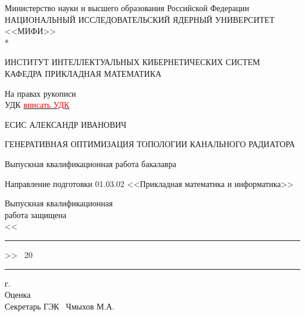 \documentclass[a4paper,12pt]{extreport}
\numberwithin{equation}{chapter}
\begin{document}
\renewcommand{\contentsname}{\Large Содержание}
\renewcommand{\bibname}{\normalfont\Large\bfseries Список литературы}
\renewcommand{\figurename}{\normalfont Рис.\!}

\begin{titlepage}
	\begin{center}
		Министерство науки и высшего образования Российской Федерации \\
		НАЦИОНАЛЬНЫЙ ИССЛЕДОВАТЕЛЬСКИЙ ЯДЕРНЫЙ УНИВЕРСИТЕТ <<МИФИ>> \\*
		\hrulefill
	\end{center}
	
	\begin{center}
		ИНСТИТУТ ИНТЕЛЛЕКТУАЛЬНЫХ КИБЕРНЕТИЧЕСКИХ СИСТЕМ\\
		КАФЕДРА  ПРИКЛАДНАЯ МАТЕМАТИКА
	\end{center}
	\vspace{1cm}
	
	\begin{flushright}
		На правах рукописи\\
		УДК \underline{\textcolor{red}{вписать УДК}}
	\end{flushright}
	
	\vspace{0.5em}
	
	\begin{center}
		ЕСИС АЛЕКСАНДР ИВАНОВИЧ
	\end{center}
	
	\vspace{1em}
	
	\begin{center}
		\large ГЕНЕРАТИВНАЯ ОПТИМИЗАЦИЯ ТОПОЛОГИИ КАНАЛЬНОГО РАДИАТОРА
	\end{center}
	
	\vspace{2em}
	
	\begin{center}
		\large{Выпускная квалификационная работа бакалавра}
	\end{center}
	
	\vspace{1em}
	
	\begin{center}
		Направление подготовки 01.03.02 <<Прикладная математика и информатика>>
	\end{center}
	
	\vspace{2.5em}
	
	\hfill \begin{minipage}[t]{75mm}
		Выпускная квалификационная\\
		работа защищена\\
		<<\rule[0mm]{0.8cm}{0.1mm}>> \hrulefill \ 20\rule[0mm]{0.4cm}{0.1mm} г.\\
		Оценка \hrulefill\\
		Секретарь ГЭК \hrulefill \ Чмыхов М.А.
	\end{minipage}
	

\end{titlepage}
\end{document}
